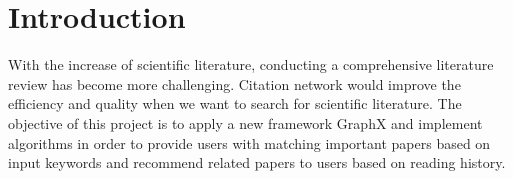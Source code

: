 \section{Introduction}

With the increase of scientific literature, conducting a comprehensive literature review has become more challenging. Citation network would improve the efficiency and quality when we want to search for scientific literature. The objective of this project is to apply a new framework GraphX and implement algorithms in order to provide users with matching important papers based on input keywords and recommend related papers to users based on reading history.